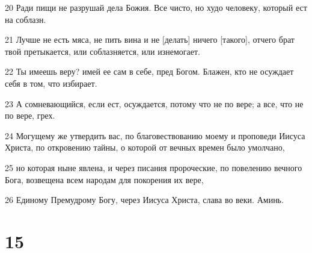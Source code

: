 \par 20 Ради пищи не разрушай дела Божия. Все чисто, но худо человеку, который ест на соблазн.
\par 21 Лучше не есть мяса, не пить вина и не [делать] ничего [такого], отчего брат твой претыкается, или соблазняется, или изнемогает.
\par 22 Ты имеешь веру? имей ее сам в себе, пред Богом. Блажен, кто не осуждает себя в том, что избирает.
\par 23 А сомневающийся, если ест, осуждается, потому что не по вере; а все, что не по вере, грех.
\par 24 Могущему же утвердить вас, по благовествованию моему и проповеди Иисуса Христа, по откровению тайны, о которой от вечных времен было умолчано,
\par 25 но которая ныне явлена, и через писания пророческие, по повелению вечного Бога, возвещена всем народам для покорения их вере,
\par 26 Единому Премудрому Богу, через Иисуса Христа, слава во веки. Аминь.

\chapter{15}

